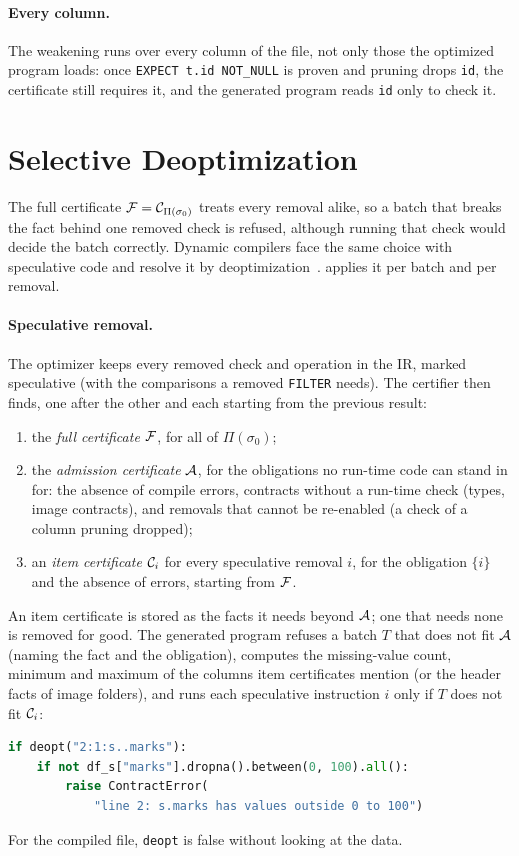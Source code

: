 \paragraph{Every column.} The weakening runs over every column of the file, not only those the
optimized program loads: once \texttt{EXPECT t.id NOT\_NULL} is proven and pruning drops \texttt{id},
the certificate still requires it, and the generated program reads \texttt{id} only to check it.

\section{Selective Deoptimization}\label{sec:deopt}

The full certificate $\mathcal{F} = \mathcal{C}_{\Pi(\sigma_0)}$ treats every removal alike, so a batch that breaks
the fact behind one removed check is refused, although running that check would decide the batch
correctly. Dynamic compilers face the same choice with speculative code and resolve it by
deoptimization~\cite{holzle1992}. \PL applies it per batch and per removal.

\paragraph{Speculative removal.} The optimizer keeps every removed check and operation in the IR,
marked speculative (with the comparisons a removed \texttt{FILTER} needs). The certifier then finds,
one after the other and each starting from the previous result:
\begin{enumerate}
\item the \emph{full certificate} $\mathcal{F}$, for all of $\Pi(\sigma_0)$;
\item the \emph{admission certificate} $\mathcal{A}$, for the obligations no run-time code can stand in
for: the absence of compile errors, contracts without a run-time check (types, image contracts),
and removals that cannot be re-enabled (a check of a column pruning dropped);
\item an \emph{item certificate} $\mathcal{C}_{i}$ for every speculative removal $i$, for the obligation
$\{i\}$ and the absence of errors, starting from $\mathcal{F}$.
\end{enumerate}
An item certificate is stored as the facts it needs beyond $\mathcal{A}$; one that needs none is removed for
good. The generated program refuses a batch $T$ that does not fit $\mathcal{A}$ (naming the fact and the
obligation), computes the missing-value count, minimum and maximum of the columns item certificates
mention (or the header facts of image folders), and runs each speculative instruction $i$ only if
$T$ does not fit $\mathcal{C}_{i}$:
\begin{lstlisting}[language=Python,numbers=none]
if deopt("2:1:s..marks"):
    if not df_s["marks"].dropna().between(0, 100).all():
        raise ContractError(
            "line 2: s.marks has values outside 0 to 100")
\end{lstlisting}
For the compiled file, \texttt{deopt} is false without looking at the data.

